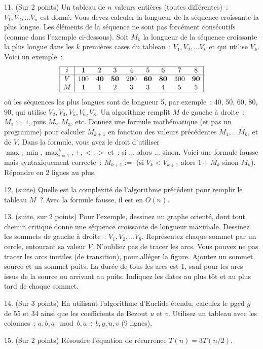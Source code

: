 \documentclass[11pt]{article}
\begin{document}
{11. (Sur 2 points)  Un tableau de $n$ valeurs entières (toutes différentes)~:  
$V_1, V_2, \ldots V_n$ est donné.
Vous devez calculer la longueur de la séquence croissante la plus longue.
Les éléments de la séquence ne sont pas forcément consécutifs (comme dans l'exemple ci-dessous).
Soit $M_k$ la longueur de la séquence croissante la plus longue 
dans les $k$ premières cases du tableau~: $V_1, V_2, \ldots V_k$ et qui
utilise $V_k$. 
Voici un exemple~:
$$\begin{array}{|c|cccccccc|}
\hline
i & 1 & 2 & 3 & 4 & 5 & 6 & 7 & 8 \\
\hline
V & 100 & {\bf 40} & {\bf 50} & 200 & {\bf 60} & {\bf 80} & 300 & {\bf 90} \\
M & 1 & 1 & 2 & 3 & 3 & 4 & 5 & 5 \\
\hline
\end{array}
$$
où les séquences les plus longues sont de longueur 5, par exemple~:
40, 50, 60, 80, 90, qui utilise $V_2, V_3, V_5, V_6, V_8$.
Un algorithme remplit $M$ de gauche à droite~: $M_1:=1$, puis $M_2, M_3$, etc. 
Donnez une formule mathématique (et pas un programme) pour calculer 
$M_{k+1}$ en
fonction des valeurs précédentes  $M_1, \ldots  M_k$, et de $V$. 
Dans la formule, vous avez le droit d'utiliser $\max, \min, \max_{i=1}^k, +, <, >$ et~:
si ... alors ... sinon. Voici une formule fausse mais syntaxiquement correcte~:
$M_{k+1} :=$ (si $V_k <  V_{k+1}$ alors $1 + M_k$ sinon $M_k$). 
Répondre en 2 lignes au plus. 
 
12.  (suite) Quelle est la complexité de l'algorithme précédent pour remplir le tableau $M$~? Avec la formule fausse, il est en $O(n)$.
 
13. (suite, sur 2 points) Pour l'exemple, dessinez un graphe orienté, dont tout chemin critique donne une séquence croissante de longueur maximale. 
Dessinez les sommets
de gauche à droite~: $V_1, V_2, \ldots V_8$.
Représentez chaque sommet par un cercle, entourant sa valeur $V$. 
N'oubliez pas de tracer les arcs. Vous pouvez ne pas tracer les arcs inutiles (de transition), pour alléger la figure.
Ajoutez un sommet source et un sommet puits.
La durée
de tous les arcs est 1, sauf pour les arcs issus de la source ou arrivant au puits. 
Indiquez les dates au plus tôt et au plus tard de chaque sommet. 

14. (Sur 3 points) En utilisant l'algorithme d'Euclide étendu, calculez le pgcd $g$ de 55 et 34 ainsi que les coefficients de Bezout $u$ et $v$.
Utilisez un tableau avec les colonnes~: $a, b, a\mod b, a\div b, g, u, v$ (9 lignes).

15. (Sur 2 points) Résoudre l'équation de récurrence $T(n)=3T(n/2)$.
}
\end{document}
